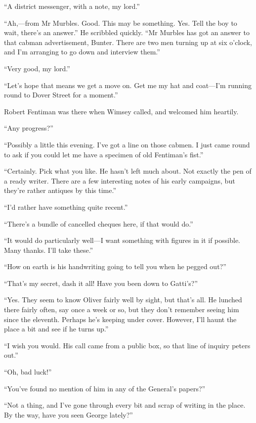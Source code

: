 \enquote{A district messenger, with a note, my lord.}

\enquote{Ah,---from Mr Murbles. Good. This may be something. Yes. Tell the boy to wait, there's an answer.} He scribbled quickly. \enquote{Mr Murbles has got an answer to that cabman advertisement, Bunter. There are two men turning up at six o'clock, and I'm arranging to go down and interview them.}

\enquote{Very good, my lord.}

\enquote{Let's hope that means we get a move on. Get me my hat and coat\allowbreak---\allowbreak I'm running round to Dover Street for a moment.}

Robert Fentiman was there when Wimsey called, and welcomed him heartily.

\enquote{Any progress?}

\enquote{Possibly a little this evening. I've got a line on those cabmen. I just came round to ask if you could let me have a specimen of old Fentiman's fist.}

\enquote{Certainly. Pick what you like. He hasn't left much about. Not exactly the pen of a ready writer. There are a few interesting notes of his early campaigns, but they're rather antiques by this time.}

\enquote{I'd rather have something quite recent.}

\enquote{There's a bundle of cancelled cheques here, if that would do.}

\enquote{It would do particularly well\allowbreak---\allowbreak I want something with figures in it if possible. Many thanks. I'll take these.}

\enquote{How on earth is his handwriting going to tell you when he pegged out?}

\enquote{That's my secret, dash it all! Have you been down to Gatti's?}

\enquote{Yes. They seem to know Oliver fairly well by sight, but that's all. He lunched there fairly often, say once a week or so, but they don't remember seeing him since the eleventh. Perhaps he's keeping under cover. However, I'll haunt the place a bit and see if he turns up.}

\enquote{I wish you would. His call came from a public box, so that line of inquiry peters out.}

\enquote{Oh, bad luck!}

\enquote{You've found no mention of him in any of the General's papers?}

\enquote{Not a thing, and I've gone through every bit and scrap of writing in the place. By the way, have you seen George lately?}

